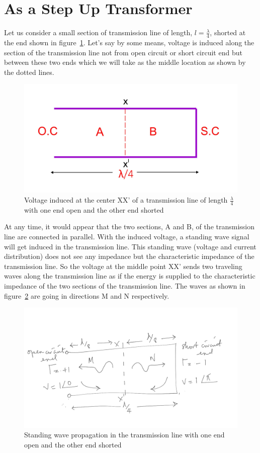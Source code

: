 \section{As a Step Up Transformer}
Let us consider a small section of transmission line of length, $l = \frac{\lambda}{4}$, shorted at the end shown in figure~\ref{fig:fig5}. Let's say by some means, voltage is induced along the section of the transmission line not from open circuit or short circuit end but between these two ends which we will take as the middle location as shown by the dotted lines.
\begin{figure}[h]
\centering
\includegraphics[width=1\linewidth]{./graphics/fig5}
\caption{Voltage induced at the center XX' of a transmission line of length $\frac{\lambda}{4}$ with one end open and the other end shorted}
\label{fig:fig5}
\end{figure}

 At any time, it would appear that the two sections, A and B, of the transmission line are connected in parallel. With the induced voltage, a standing wave signal will get induced in the transmission line. This standing wave (voltage and current distribution) does not see any impedance but the characteristic impedance of the transmission line. So the voltage at the middle point XX' sends two traveling waves along the transmission line as if the energy is supplied to the characteristic impedance of the two sections of the transmission line. The waves as shown in figure~\ref{fig:fig6} are going in directions M and N respectively.
 \begin{figure}[h]
\centering
\includegraphics[width=1\linewidth]{./graphics/step_up_transformer_temp}
\caption{Standing wave propagation in the transmission line with one end open and the other end shorted}
\label{fig:fig6}
\end{figure}

